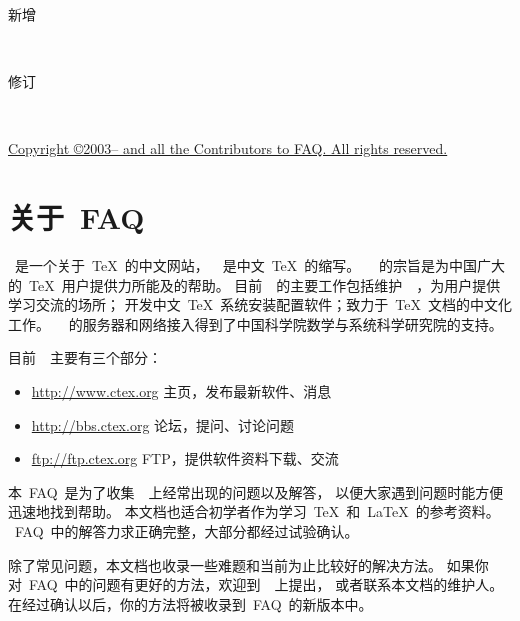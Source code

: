 \documentclass[a4paper]{article}
\begin{document}
\begin{lined}{\textwidth}\small
\begin{description}
    \item[新增]~\listofnewfaqs
    \item[修订]~\listofrevfaqs
\end{description}
\end{lined}

\begin{center}
\hyperlink{copyright}{\small Copyright \copyright 2003--\the\year{} \CTeX{} and
all the Contributors to \CTeX{} FAQ. All rights reserved.}
\end{center}


\tableofcontents


\section{关于~FAQ}


\CTeX{}~是一个关于~\TeX{}~的中文网站，~\CTeX{}~是中文~\TeX{}~的缩写。
~\CTeX{}~的宗旨是为中国广大的~\TeX{}~用户提供力所能及的帮助。
目前~\CTeX{}~的主要工作包括维护~\CTeXWWW~，为用户提供学习交流的场所；
开发中文~\TeX{}~系统安装配置软件；致力于~\TeX{}~文档的中文化工作。
~\CTeX{}~的服务器和网络接入得到了中国科学院数学与系统科学研究院的支持。


目前~\CTeX{}~主要有三个部分：
\begin{itemize}
    \item \url{http://www.ctex.org} \quad 主页，发布最新软件、消息
    \item \url{http://bbs.ctex.org} \quad 论坛，提问、讨论问题
    \item \url{ftp://ftp.ctex.org} \quad FTP，提供软件资料下载、交流
\end{itemize}


本~FAQ~是为了收集~\CTeXBBS~上经常出现的问题以及解答，
以便大家遇到问题时能方便迅速地找到帮助。
本文档也适合初学者作为学习~\TeX{}~和~\LaTeX{}~的参考资料。
~FAQ~中的解答力求正确完整，大部分都经过试验确认。

除了常见问题，本文档也收录一些难题和当前为止比较好的解决方法。
如果你对~FAQ~中的问题有更好的方法，欢迎到~\CTeXBBS~上提出，
或者联系本文档的维护人。在经过确认以后，你的方法将被收录到~FAQ~的新版本中。
\end{document}
